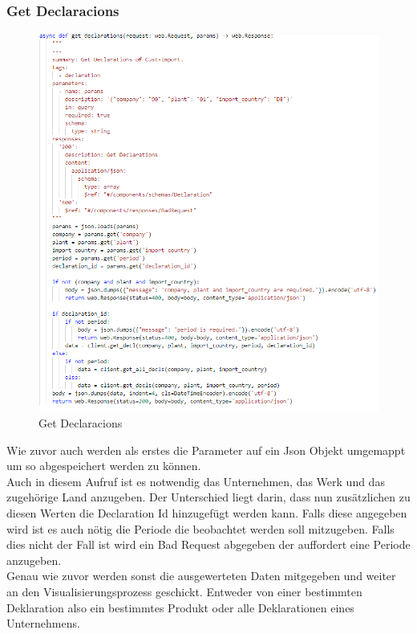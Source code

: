 \subsubsection{Get Declaracions}
\begin{figure}[H]
\centering
  \includegraphics[scale=0.5]{images/GetDeclaracions.PNG}
  \caption[Get Declaracions]{Get Declaracions}
  \label{fig:Get-Declaracions}
\end{figure}
Wie zuvor auch werden als erstes die Parameter auf ein Json Objekt umgemappt um so abgespeichert werden zu können.\\

Auch in diesem Aufruf ist es notwendig das Unternehmen, das Werk und das zugehörige Land anzugeben. Der Unterschied liegt darin, dass nun zusätzlichen zu diesen Werten die Declaration Id hinzugefügt werden kann. Falls diese angegeben wird ist es auch nötig die Periode die beobachtet werden soll mitzugeben. Falls dies nicht der Fall ist wird ein Bad Request abgegeben der auffordert eine Periode anzugeben.\\

Genau wie zuvor werden sonst die ausgewerteten Daten mitgegeben und weiter an den Visualisierungsprozess geschickt. Entweder von einer bestimmten Deklaration also ein bestimmtes Produkt oder alle Deklarationen eines Unternehmens.
